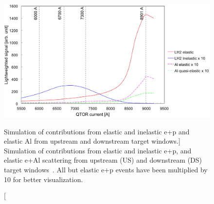 \begin{figure}[!h]
	\begin{center}
	\includegraphics[width=15.0cm]{figures/qtorScan}
	\end{center}
	\caption
	[Simulation of contributions from elastic and inelastic e+p and elastic Al from upstream and downstream target windows.]
	{
Simulation of contributions from elastic and inelastic e+p, and elastic e+Al scattering from upstream (US) and downstream (DS) target windows~\cite{elog:adesh_analysis837}. All but elastic e+p events have been multiplied by 10 for better visualization.}
	\label{fig:qtorScan}
\end{figure}


